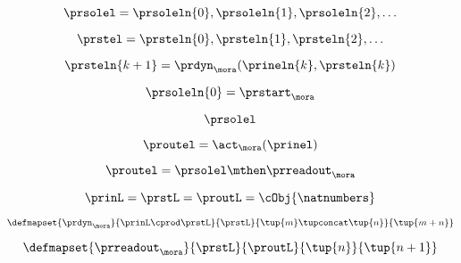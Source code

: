 \begin{forslides}
    \begin{equation}
        \label{eq:slides-processes-06}
        \prsolel = \prsoleln{0}, \prsoleln{1}, \prsoleln{2}, \ldots
    \end{equation}
    
    \begin{equation}
        \label{eq:slides-processes-06b}
        \prstel = \prsteln{0}, \prsteln{1}, \prsteln{2}, \ldots
    \end{equation}

    \begin{equation}
        \label{eq:slides-processes-07}
        \prsteln{k+1} = \prdyn_\mora(\prineln{k}, \prsteln{k}) 
    \end{equation}

\begin{equation}
        \label{eq:slides-processes-07b}
        \prsoleln{0} = \prstart_\mora
    \end{equation}

    \begin{equation}
        \label{eq:slides-processes-08}
        \prsolel
    \end{equation}

    \begin{equation}
        \label{eq:slides-processes-09}
        \proutel = \act_{\mora}(\prinel)
    \end{equation}
    
    \begin{equation}
        \label{eq:slides-processes-10}
        \proutel = \prsolel \mthen \prreadout_\mora
    \end{equation}

    \begin{equation}
        \label{eq:slides-processes-11}
        \prinL = \prstL = \proutL = \cObj{\natnumbers}
    \end{equation}

    \begin{equation}
        \label{eq:slides-processes-12}
        \defmapset{
            \prdyn_\mora
        }{
            \prinL \cprod \prstL
        }{
            \prstL
        }{
            \tup{m} \tupconcat \tup{n}
        }{
            \tup{m + n}
        }
    \end{equation}

    \begin{equation}
        \label{eq:slides-processes-13}
        \defmapset{
            \prreadout_\mora
        }{
            \prstL
        }{
            \proutL
        }{
            \tup{n}
        }{
            \tup{n+1}
        }
    \end{equation}


\end{forslides}
